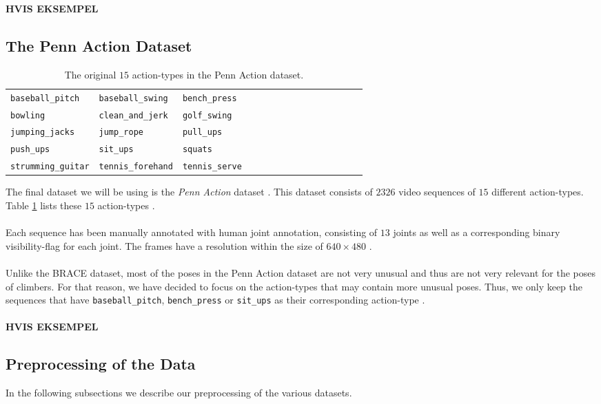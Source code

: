 \documentclass[./main.tex]{subfiles}
\begin{document}
\textbf{HVIS EKSEMPEL}

\subsection{The Penn Action Dataset}
\begin{table}
    \begin{tabular}[htbp]{lllllllllllllll}
        \texttt{baseball\_pitch} & \texttt{baseball\_swing} & \texttt{bench\_press} \\
        \texttt{bowling} & \texttt{clean\_and\_jerk} & \texttt{golf\_swing} \\
        \texttt{jumping\_jacks} & \texttt{jump\_rope} & \texttt{pull\_ups} \\
        \texttt{push\_ups} & \texttt{sit\_ups} & \texttt{squats} \\
        \texttt{strumming\_guitar} & \texttt{tennis\_forehand} & \texttt{tennis\_serve}
    \end{tabular}
    \caption{The original $15$ action-types in the Penn Action dataset.}
    \label{tab:PA_actions}
\end{table}
The final dataset we will be using is the \textit{Penn Action} dataset \cite{penn_action}. This dataset consists of $2326$ video sequences of $15$ different action-types. Table \ref{tab:PA_actions} lists these $15$ action-types \cite{penn_action}.
\\
\\
Each sequence has been manually annotated with human joint annotation, consisting of $13$ joints as well as a corresponding binary visibility-flag for each joint. The frames have a resolution within the size of $640 \times 480$ \cite{penn_action}.
\\
\\
Unlike the BRACE dataset, most of the poses in the Penn Action dataset are not very unusual and thus are not very relevant for the poses of climbers. For that reason, we have decided to focus on the action-types that may contain more unusual poses. Thus, we only keep the sequences that have \texttt{baseball\_pitch}, \texttt{bench\_press} or \texttt{sit\_ups} as their corresponding action-type \cite{penn_action}.
\\
\\
\textbf{HVIS EKSEMPEL}

\subsection{Preprocessing of the Data}
In the following subsections we describe our preprocessing of the various datasets.
\end{document}
